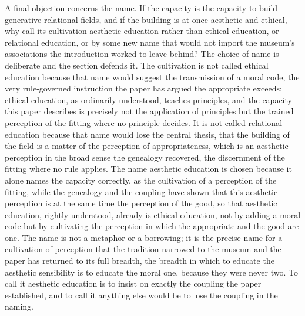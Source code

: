 A final objection concerns the name. If the capacity is the capacity to build generative relational fields, and if the building is at once aesthetic and ethical, why call its cultivation aesthetic education rather than ethical education, or relational education, or by some new name that would not import the museum's associations the introduction worked to leave behind? The choice of name is deliberate and the section defends it. The cultivation is not called ethical education because that name would suggest the transmission of a moral code, the very rule-governed instruction the paper has argued the appropriate exceeds; ethical education, as ordinarily understood, teaches principles, and the capacity this paper describes is precisely not the application of principles but the trained perception of the fitting where no principle decides. It is not called relational education because that name would lose the central thesis, that the building of the field is a matter of the perception of appropriateness, which is an aesthetic perception in the broad sense the genealogy recovered, the discernment of the fitting where no rule applies. The name aesthetic education is chosen because it alone names the capacity correctly, as the cultivation of a perception of the fitting, while the genealogy and the coupling have shown that this aesthetic perception is at the same time the perception of the good, so that aesthetic education, rightly understood, already is ethical education, not by adding a moral code but by cultivating the perception in which the appropriate and the good are one. The name is not a metaphor or a borrowing; it is the precise name for a cultivation of perception that the tradition narrowed to the museum and the paper has returned to its full breadth, the breadth in which to educate the aesthetic sensibility is to educate the moral one, because they were never two. To call it aesthetic education is to insist on exactly the coupling the paper established, and to call it anything else would be to lose the coupling in the naming.
